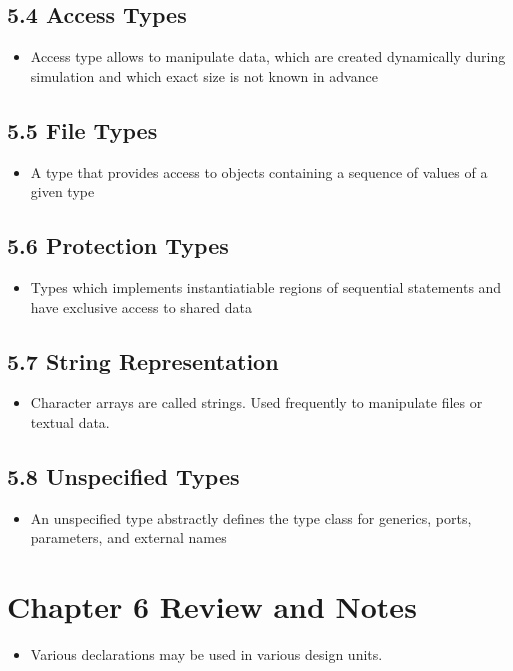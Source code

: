 \documentclass[a4paper,12pt]{article}
\begin{document}
	\subsection*{5.4 Access Types}
	\begin{itemize}
		\item Access type allows to manipulate data, which are created dynamically during simulation and which exact size is not known in advance
	\end{itemize}
	
	\subsection*{5.5 File Types}
	\begin{itemize}
		\item A type that provides access to objects containing a sequence of values of a given type
	\end{itemize}
	
	\subsection*{5.6 Protection Types}
	\begin{itemize}
		\item Types which implements instantiatiable regions of sequential statements and have exclusive access to shared data
	\end{itemize}
	
	\subsection*{5.7 String Representation}
	\begin{itemize}
		\item Character arrays are called strings. Used frequently to manipulate files or textual data.
	\end{itemize}
	
	\subsection*{5.8 Unspecified Types}
	\begin{itemize}
		\item An unspecified type abstractly defines the type class for generics, ports, parameters, and external names
	\end{itemize}
	
	\section*{Chapter 6 Review and Notes}
	\begin{itemize}
		\item Various declarations may be used in various design units.
	\end{itemize}
	
\end{document}
